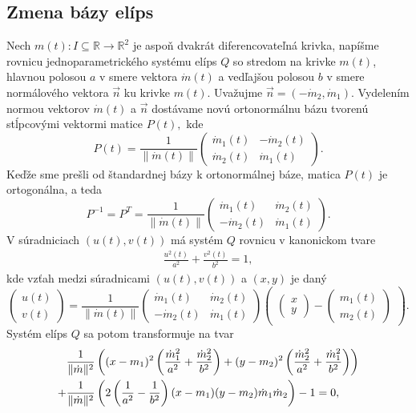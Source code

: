 \subsection{Zmena bázy elíps}
Nech $m(t) \colon  I \subseteq \mathbb{R} \rightarrow \mathbb{R}^2$ je aspoň dvakrát diferencovateľná krivka, napíšme rovnicu jednoparametrického systému elíps $Q$ so stredom na krivke $m(t)$, hlavnou polosou $a$ v smere vektora $\dot{m}(t)$ a vedľajšou polosou $b$ v smere normálového vektora $\vec{n}$ ku krivke $m(t)$. Uvažujme $\vec{n}=(-\dot{m}_2, \dot{m}_1). $ Vydelením normou vektorov $\dot{m}(t)$ a $\vec{n}$ dostávame novú ortonormálnu bázu tvorenú stĺpcovými vektormi matice $P(t),$ kde
$$
P(t) = \frac{1}{ \| \dot{m}(t) \|} \left(\begin{matrix}
   \dot{m}_1(t) & -\dot{m}_2(t) \\
   \dot{m}_2(t) & \dot{m}_1(t)
\end{matrix} \right).
$$
Keďže sme prešli od štandardnej bázy k ortonormálnej báze, matica $P(t)$ je ortogonálna, a teda
$$
P^{-1} = P^{T} = \frac{1}{ \| \dot{m}(t) \|} \left(\begin{matrix}
  \dot{m}_1(t) & \dot{m}_2(t) \\
  -\dot{m}_2(t) & \dot{m}_1(t)
\end{matrix}\right).
$$
V súradniciach $(u(t), v(t))$ má systém $Q$ rovnicu v kanonickom tvare 
\begin{align*}
\frac{u^2(t)}{a^2} + \frac{v^2(t)}{b^2} = 1,
\end{align*}
kde vzťah medzi súradnicami $(u(t), v(t))$ a $(x,y)$ je daný
$$
\left(\begin{matrix}
u(t) \\
v(t)
\end{matrix}\right) = \frac{1}{ \| \dot{m}(t) \|}
\left(\begin{matrix}
  \dot{m}_1(t) & \dot{m}_2(t) \\
   -\dot{m}_2(t) & \dot{m}_1(t)
\end{matrix}\right)
\left(\begin{matrix} \left(\begin{matrix} x \\ y \end{matrix}\right) - \left(\begin{matrix} m_1(t) \\ m_2(t) \end{matrix}\right) \end{matrix}\right).
$$
Systém elíps $Q$ sa potom transformuje na tvar
\begin{align} 
\label{eq:elipsa_v_novej_baze}
&\frac{1}{\|{\dot{m}}\|^2} \left( (x - m_1)^2 \left( \frac{{\dot{m}_1}^2}{a^2} + \frac{{\dot{m}_2}^2}{b^2} \right) + (y - m_2)^2 \left( \frac{{\dot{m}_2}^2}{a^2} + \frac{{\dot{m}_1}^2}{b^2} \right) \right) \notag \\
+ &\frac{1}{\|{\dot{m}}\|^2} \left( 2\left( \frac{1}{a^2} - \frac{1}{b^2} \right)(x - m_1)(y - m_2)\dot{m}_1\dot{m}_2 \right) - 1 = 0,
\end{align}
